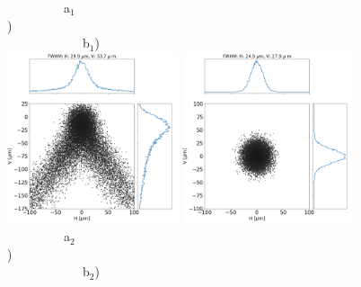 \documentclass[]{article}
\begin{document}
  

\thispagestyle{empty}


\begin{figure}\label{fig:als}
\flushleft
~~~~~~~~~a$_1$)~~~~~~~~~~~~~~~~~~~~~~~~~~~~~~~~~~~~~~~~~~~~~~~~~~~~~~~~~~~~~~~~~~~~~~~b$_1$) \\
\centering
\includegraphics[width=0.45\textwidth]{figures/als_toroid.png}
\includegraphics[width=0.45\textwidth]{figures/als_diaboloid.png} \\

\flushleft
~~~~~~~~~a$_2$)~~~~~~~~~~~~~~~~~~~~~~~~~~~~~~~~~~~~~~~~~~~~~~~~~~~~~~~~~~~~~~~~~~~~~~~b$_2$) \\
\centering


\end{figure}
\end{document}
